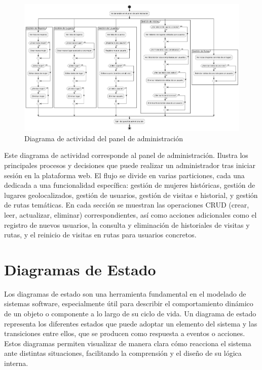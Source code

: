 \begin{figure}[H]
    \centering
    \includegraphics[width=1\textwidth]{figs/diagrama_actividad_administrador.png}
    \caption{Diagrama de actividad del panel de administración}
\end{figure}

Este diagrama de actividad corresponde al panel de administración. Ilustra los principales procesos y decisiones que puede realizar un administrador tras iniciar sesión en la plataforma web. El flujo se divide en varias particiones, cada una dedicada a una funcionalidad específica: gestión de mujeres históricas, gestión de lugares geolocalizados, gestión de usuarios, gestión de visitas e historial, y gestión de rutas temáticas. En cada sección se muestran las operaciones CRUD (crear, leer, actualizar, eliminar) correspondientes, así como acciones adicionales como el registro de nuevos usuarios, la consulta y eliminación de historiales de visitas y rutas, y el reinicio de visitas en rutas para usuarios concretos.

\section{Diagramas de Estado}
Los diagramas de estado son una herramienta fundamental en el modelado de sistemas software, especialmente útil para describir el comportamiento dinámico de un objeto o componente a lo largo de su ciclo de vida. Un diagrama de estado representa los diferentes estados que puede adoptar un elemento del sistema y las transiciones entre ellos, que se producen como respuesta a eventos o acciones. Estos diagramas permiten visualizar de manera clara cómo reacciona el sistema ante distintas situaciones, facilitando la comprensión y el diseño de su lógica interna.

